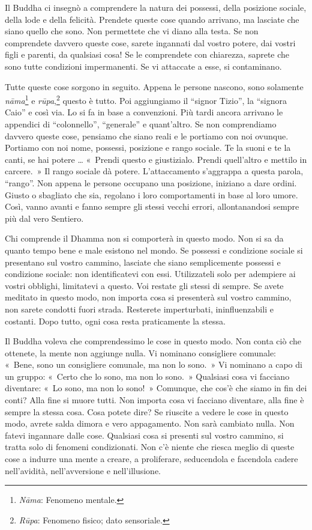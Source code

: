 Il Buddha ci insegnò a comprendere la natura dei possessi, della
posizione sociale, della lode e della felicità. Prendete queste cose
quando arrivano, ma lasciate che siano quello che sono. Non permettete
che vi diano alla testa. Se non comprendete davvero queste cose, sarete
ingannati dal vostro potere, dai vostri figli e parenti, da qualsiasi
cosa! Se le comprendete con chiarezza, saprete che sono tutte condizioni
impermanenti. Se vi attaccate a esse, si contaminano.

Tutte queste cose sorgono in seguito. Appena le persone nascono, sono
solamente \emph{nāma}\footnote{\emph{Nāma}: Fenomeno mentale.} e
\emph{rūpa},\footnote{\emph{Rūpa}: Fenomeno fisico; dato sensoriale.}
questo è tutto. Poi aggiungiamo il ``signor Tizio'', la ``signora Caio''
e così via. Lo si fa in base a convenzioni. Più tardi ancora arrivano le
appendici di ``colonnello'', ``generale'' e quant'altro. Se non
comprendiamo davvero queste cose, pensiamo che siano reali e le portiamo
con noi ovunque. Portiamo con noi nome, possessi, posizione e rango
sociale. Te la suoni e te la canti, se hai potere \ldots{} «~Prendi questo e
giustizialo. Prendi quell'altro e mettilo in carcere.~» Il rango sociale
dà potere. L'attaccamento s'aggrappa a questa parola, ``rango''. Non
appena le persone occupano una posizione, iniziano a dare ordini. Giusto
o sbagliato che sia, regolano i loro comportamenti in base al loro
umore. Così, vanno avanti e fanno sempre gli stessi vecchi errori,
allontanandosi sempre più dal vero Sentiero.

Chi comprende il Dhamma non si comporterà in questo modo. Non si sa da
quanto tempo bene e male esistono nel mondo. Se possessi e condizione
sociale si presentano sul vostro cammino, lasciate che siano
semplicemente possessi e condizione sociale: non identificatevi con
essi. Utilizzateli solo per adempiere ai vostri obblighi, limitatevi a
questo. Voi restate gli stessi di sempre. Se avete meditato in questo
modo, non importa cosa si presenterà sul vostro cammino, non sarete
condotti fuori strada. Resterete imperturbati, ininfluenzabili e
costanti. Dopo tutto, ogni cosa resta praticamente la stessa.

Il Buddha voleva che comprendessimo le cose in questo modo. Non conta
ciò che ottenete, la mente non aggiunge nulla. Vi nominano consigliere
comunale: «~Bene, sono un consigliere comunale, ma non lo sono.~» Vi
nominano a capo di un gruppo: «~Certo che lo sono, ma non lo sono.~»
Qualsiasi cosa vi facciano diventare: «~Lo sono, ma non lo sono!~»
Comunque, che cos'è che siamo in fin dei conti? Alla fine si muore
tutti. Non importa cosa vi facciano diventare, alla fine è sempre la
stessa cosa. Cosa potete dire? Se riuscite a vedere le cose in questo
modo, avrete salda dimora e vero appagamento. Non sarà cambiato nulla.
Non fatevi ingannare dalle cose. Qualsiasi cosa si presenti sul vostro
cammino, si tratta solo di fenomeni condizionati. Non c'è niente che
riesca meglio di queste cose a indurre una mente a creare, a
proliferare, seducendola e facendola cadere nell'avidità,
nell'avversione e nell'illusione.

